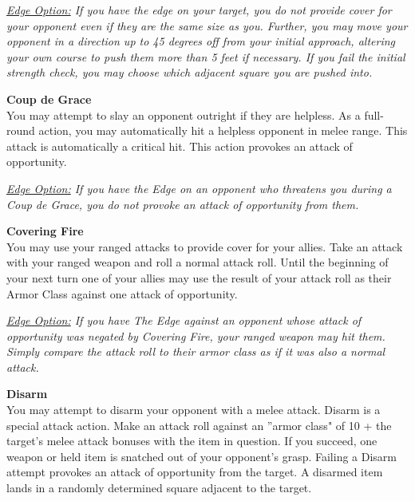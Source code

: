 \smallskip\emph{\underline{Edge Option:} If you have the edge on your target, you do not provide cover for your opponent even if they are the same size as you. Further, you may move your opponent in a direction up to 45 degrees off from your initial approach, altering your own course to push them more than 5 feet if necessary. If you fail the initial strength check, you may choose which adjacent square you are pushed into.}\\

\hypertarget{combat:coupdegrace}{}
\normalsize\item\textbf{{Coup de Grace}}\\\small
You may attempt to slay an opponent outright if they are helpless. As a full-round action, you may automatically hit a helpless opponent in melee range. This attack is automatically a critical hit. This action provokes an attack of opportunity.


\smallskip\emph{\underline{Edge Option:} If you have the Edge on an opponent who threatens you during a Coup de Grace, you do not provoke an attack of opportunity from them.}\\

\hypertarget{combat:coveringfire}{}
\normalsize\item\textbf{{Covering Fire}}\\\small
You may use your ranged attacks to provide cover for your allies. Take an attack with your ranged weapon and roll a normal attack roll. Until the beginning of your next turn one of your allies may use the result of your attack roll as their Armor Class against one attack of opportunity.

\smallskip\emph{\underline{Edge Option:} If you have The Edge against an opponent whose attack of opportunity was negated by Covering Fire, your ranged weapon may hit them. Simply compare the attack roll to their armor class as if it was also a normal attack.}\\

\hypertarget{combat:disarm}{}
\normalsize\item\textbf{{Disarm}}\\\small
You may attempt to disarm your opponent with a melee attack. Disarm is a special attack action. Make an attack roll against an ''armor class" of 10 + the target's melee attack bonuses with the item in question. If you succeed, one weapon or held item is snatched out of your opponent's grasp. Failing a Disarm attempt provokes an attack of opportunity from the target. A disarmed item lands in a randomly determined square adjacent to the target.

